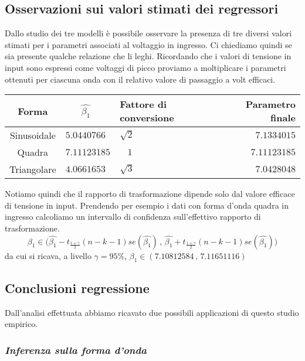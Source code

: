 \documentclass[a4paper]{article}
\begin{document}
		\subsection{Osservazioni sui valori stimati dei regressori}
		Dallo studio dei tre modelli è possibile osservare la presenza di tre diversi valori stimati per i parametri associati al voltaggio in ingresso. Ci chiediamo quindi se sia presente qualche relazione che li leghi. Ricordando che i valori di tensione in input sono espressi come voltaggi di picco proviamo a moltiplicare i parametri ottenuti per ciascuna onda con il relativo valore di passaggio a volt efficaci.
		\bigskip
		\begin{center}
			\begin{tabular}{cllr} 
				\toprule
			Forma & $\,\,\,\,\,\,\,\,\,\,\hat{\beta_1}$ & Fattore di conversione & Parametro finale \\
			\midrule
			Sinusoidale & $5.0440766$ & \hspace{1.1cm}$\sqrt{2}$ & $7.1334015$ \\
			Quadra & $7.11123185$ & \hspace{1.1cm}$\,\,\,\,\,1$ & $7.11123185$ \\
			Triangolare & $4.0661653$ & \hspace{1.1cm}$\sqrt{3}$ & $7.0428048$ \\	
			\bottomrule
			\end{tabular}
		\end{center}
	\bigskip
	Notiamo quindi che il rapporto di trasformazione dipende solo dal valore efficace di tensione in input. Prendendo per esempio i dati con forma d’onda quadra in ingresso calcoliamo un intervallo di confidenza sull’effettivo rapporto di trasformazione.
	\[\beta_1 \in \biggl(\hat{\beta_1}-t_\frac{1+\gamma}{2}(n-k-1)se(\hat{\beta_1})\,,\,\hat{\beta_1}+t_\frac{1+\gamma}{2}(n-k-1)se(\hat{\beta_1})\biggr)\]
	da cui si ricava, a livello $\gamma=95\%$, $\beta_1 \in (7.10812584\,,\,7.11651116)$
	
	
	\subsection{Conclusioni regressione}
	
	Dall’analisi effettuata abbiamo ricavato due possibili applicazioni di questo studio empirico.
	
	\subsubsection*{\textit{Inferenza sulla forma d’onda}}
	
\end{document}
